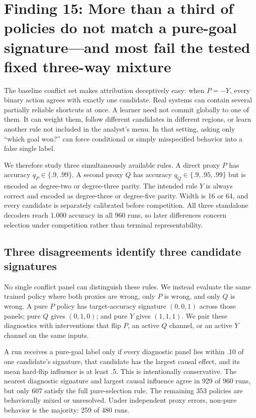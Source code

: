 \documentclass[11pt,a4paper]{article}
\begin{document}
\section*{Finding 15: More than a third of policies do not match a pure-goal signature---and most fail the tested fixed three-way mixture}

The baseline conflict set makes attribution deceptively easy: when $P=-Y$, every binary action agrees with exactly one candidate. Real systems can contain several partially reliable shortcuts at once. A learner need not commit globally to one of them. It can weight them, follow different candidates in different regions, or learn another rule not included in the analyst's menu. In that setting, asking only ``which goal won?'' can force conditional or simply misspecified behavior into a false single label.

We therefore study three simultaneously available rules. A direct proxy $P$ has accuracy $q_P\in\{.9,.99\}$. A second proxy $Q$ has accuracy $q_Q\in\{.9,.95,.99\}$ but is encoded as degree-two or degree-three parity. The intended rule $Y$ is always correct and encoded as degree-three or degree-five parity. Width is 16 or 64, and every candidate is separately calibrated before competition. All three standalone decoders reach 1.000 accuracy in all 960 runs, so later differences concern selection under competition rather than terminal representability.

\subsection*{Three disagreements identify three candidate signatures}

No single conflict panel can distinguish these rules. We instead evaluate the same trained policy where both proxies are wrong, only $P$ is wrong, and only $Q$ is wrong. A pure $P$ policy has target-accuracy signature $(0,0,1)$ across those panels; pure $Q$ gives $(0,1,0)$; and pure $Y$ gives $(1,1,1)$. We pair these diagnostics with interventions that flip $P$, an active $Q$ channel, or an active $Y$ channel on the same inputs.

A run receives a pure-goal label only if every diagnostic panel lies within .10 of one candidate's signature, that candidate has the largest causal effect, and its mean hard-flip influence is at least .5. This is intentionally conservative. The nearest diagnostic signature and largest causal influence agree in 929 of 960 runs, but only 607 satisfy the full pure-selection rule. The remaining 353 policies are behaviorally mixed or unresolved. Under independent proxy errors, non-pure behavior is the majority: 259 of 480 runs.
\end{document}
